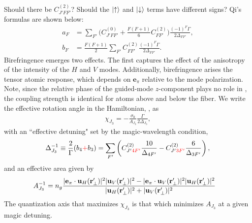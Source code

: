 \documentclass[preprint,aps,pra,onecolumn]{revtex4-1} %
\newcommand{\comment}[1]{{\color{Maroon} #1}}
\newcommand{\error}[1]{{\color{red} #1}}
\begin{document}
\comment{Should there be $ C^{(2)}_{J'FF'} $? Should the $ \lvert{\uparrow}\rangle $ and $ \lvert{\downarrow}\rangle $ terms have different signs? Qi's formulas are shown below:
\begin{align}
		a_F &= \sum_{F'}  \Big(C^{(0)}_{J'FF'} + \frac{F(F+1)}{6} C^{(2)}_{FF'} \Big) \frac{(-1)^F\Gamma}{2 \Delta_{FF'}},\\
		b_F &= \frac{F(F+1)}{2}\sum_{F'} C^{(2)}_{FF'}  \frac{(-1)^F\Gamma}{2 \Delta_{FF'}}.
	\end{align}}
Birefringence emerges two effects.  
The first captures the effect of the anisotropy of the intensity of the $H$ and $V$ modes.  
Additionally, birefringence arises the tensor atomic response, which depends on $\mathbf{e}_\pi$ relative to the mode polarization. 
Note,  since the relative phase of the guided-mode $z$-component plays no role in , the coupling strength is identical for atoms above and below the fiber.  
We write the effective rotation angle in the Hamiltonian, , as
	\begin{align} \label{Eq::chieff}
		\chi_{J_3} = - \frac{\sigma_0}{A_{J_3}} \frac{\Gamma}{ 2 \Delta_{J_3}},
	\end{align}
with an ``effective detuning" set by the magic-wavelength condition,
	\begin{align} \label{Eq::SqueezingEffectiveDetuning}
		 \Delta_{J_3}^{-1} \equiv \frac{2}{\Gamma} (b_4 \error{+} b_3) =   \sum_{F'}  \left( C^{(2)}_{J'\error{4F'}}\frac{10}{\Delta_{4F'}} -  C^{(2)}_{J'\error{3F'}}\frac{6}{ \Delta_{3F'} } \right),
	\end{align}
and an effective area given by
	\begin{align} \label{Eq::SqueezingModeArea}
		A_{J_3}^{-1} & = n_g \frac{ |\mathbf{e}_\pi \cdot \mathbf{u}_H(\mathbf{r}'_\perp) |^2 |\mathbf{u}_V(\mathbf{r}'_\perp)|^2 - |\mathbf{e}_\pi \cdot \mathbf{u}_V(\mathbf{r}'_\perp)|^2 |\mathbf{u}_H(\mathbf{r}'_\perp)|^2}{ |\mathbf{u}_H(\mathbf{r}'_\perp)|^2 + |\mathbf{u}_V(\mathbf{r}'_\perp)|^2 } 
	\end{align}	
The quantization axis that maximizes $\chi_{J_3}$ is that which minimizes $A_{J_3}$ at a given magic detuning.  
\end{document}
